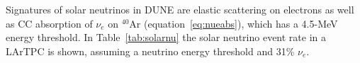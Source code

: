 Signatures of solar neutrinos in DUNE
are elastic scattering on electrons as well as CC absorption of $\nu_e$ on $^{40}$Ar (equation~\ref{eq:nueabs}), which has a 4.5-MeV energy threshold.
In Table~\ref{tab:solarnu} the solar neutrino event rate in a
 LArTPC is shown, assuming a  neutrino energy
threshold and 31\% $\nu_e$.
%
\begin{table}[!htb]
\caption[Solar neutrino rates in a LArTPC]{Solar neutrino event rates in a  LArTPC assuming 
a  neutrino energy threshold and 31\% $\nu_e$ after oscillation.}
\label{tab:solarnu}
\end{table}




